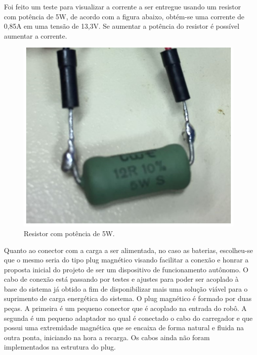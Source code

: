 Foi feito um teste para visualizar a corrente a ser entregue usando um resistor com potência de 5W, de acordo com a figura abaixo, obtém-se uma corrente de 0,85A em uma tensão de 13,3V. Se aumentar a potência do resistor é possível aumentar a corrente.


 \begin{figure}[H]
	\centering
	\includegraphics[scale=0.5]{figuras/resistorpotencia5w}
	\caption{Resistor com potência de 5W.}
	\label{img:resistorpotencia5w}
\end{figure}

Quanto ao conector com a carga a ser alimentada, no caso as baterias, escolheu-se que o mesmo seria do tipo plug magnético visando facilitar a conexão e honrar a proposta inicial do projeto de ser um dispositivo de funcionamento autônomo. O cabo de conexão está passando por testes e ajustes para poder ser acoplado à base do sistema já obtido a fim de disponibilizar mais uma solução viável para o suprimento de carga energética do sistema.
O plug magnético é formado por duas peças. A primeira é um pequeno conector que é acoplado na entrada do robô. A segunda é um pequeno adaptador no qual é conectado o cabo do carregador e que possui uma extremidade magnética que se encaixa de forma natural e fluida na outra ponta, iniciando na hora a recarga. Os cabos ainda não foram implementados na estrutura do plug.

